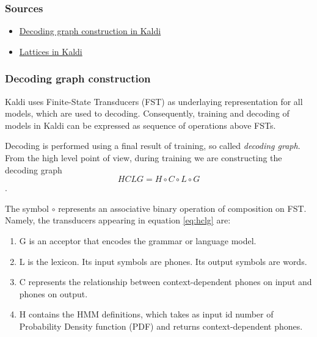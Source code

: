 \subsubsection*{Sources} %

\begin{itemize}
    \item \href{http://kaldi.sourceforge.net/graph.html} {Decoding graph construction in Kaldi}
    \item \href{http://kaldi.sourceforge.net/lattices.html} {Lattices in Kaldi}
\end{itemize}

\subsubsection*{Decoding graph construction} %
Kaldi uses Finite-State Transducers (FST) as underlaying representation for all models, which are used to decoding. Consequently, training and decoding of models in Kaldi can be expressed as sequence of operations above FSTs.

Decoding is performed using a final result of training, so called {\it decoding graph}. 
From the high level point of view,
during training we are constructing the decoding graph 
\begin{equation} \label{eq:hclg}
HCLG = H\circ C\circ L\circ G
\end{equation}.

The symbol $\circ$ represents an associative binary operation of composition on FST.
Namely, the transducers appearing in equation \ref{eq:hclg} are:
\begin{enumerate}
    \item G is an acceptor that encodes the grammar or language model.
    \item L is the lexicon. Its input symbols are phones. Its output symbols are words.
    \item C represents the relationship between context-dependent phones on input and phones on output.
    \item H contains the HMM definitions, which takes as input id number of Probability Density function (PDF) and returns context-dependent phones.
\end{enumerate}

